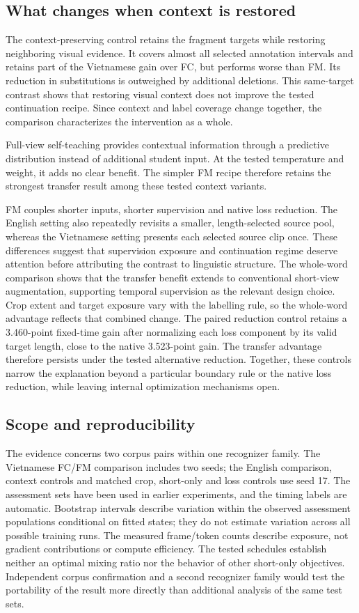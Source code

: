 \subsection{What changes when context is restored}
The context-preserving control retains the fragment targets while restoring
neighboring visual evidence. It covers almost all selected annotation intervals
and retains part of the Vietnamese gain over FC, but performs worse than FM.
Its reduction in substitutions is outweighed by additional deletions. This
same-target contrast shows that restoring visual context does not improve the
tested continuation recipe. Since context and label coverage change together,
the comparison characterizes the intervention as a whole.

Full-view self-teaching provides contextual information through a predictive
distribution instead of additional student input. At the tested temperature and
weight, it adds no clear benefit. The simpler FM recipe therefore retains the
strongest transfer result among these tested context variants.

FM couples shorter inputs, shorter supervision and native loss reduction.
The English setting also repeatedly revisits a smaller, length-selected source
pool, whereas the Vietnamese setting presents each selected source clip once.
These differences suggest that supervision exposure and continuation regime
deserve attention before attributing the contrast to linguistic structure.
The whole-word comparison shows that the transfer benefit extends to conventional
short-view augmentation, supporting temporal supervision as the relevant design
choice. Crop extent and target exposure vary with the labelling rule, so the
whole-word advantage reflects that combined change. The paired reduction control
retains a 3.460-point fixed-time gain after normalizing each loss component by
its valid target length, close to the native 3.523-point gain. The transfer
advantage therefore persists under the tested alternative reduction. Together,
these controls narrow the explanation beyond a particular boundary rule or
the native loss reduction, while leaving internal optimization mechanisms open.

\subsection{Scope and reproducibility}
The evidence concerns two corpus pairs within one recognizer family. The
Vietnamese FC/FM comparison includes two seeds; the English comparison,
context controls and matched crop, short-only and loss controls use seed 17.
The assessment sets have been used in earlier
experiments, and the timing labels are automatic. Bootstrap intervals describe
variation within the observed assessment populations conditional on fitted
states; they do not estimate variation across all possible training runs.
The measured frame/token counts describe exposure, not gradient contributions
or compute efficiency. The tested schedules establish neither an optimal mixing
ratio nor the behavior of other short-only objectives.
Independent corpus confirmation and a second recognizer family would test
the portability of the result more directly than additional analysis of the
same test sets.

